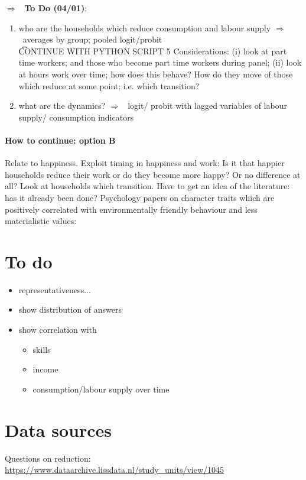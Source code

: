 \documentclass[12pt]{article}
\newcommand{\ar}{$\Rightarrow$ \ }
\begin{document}
\ar \textbf{To Do (04/01)}:
\begin{enumerate}
\item who are the households which reduce consumption and labour supply \ar averages by group; pooled logit/probit\\ 
\t{CONTINUE WITH PYTHON SCRIPT 5}
Considerations:
(i) look at part time workers; and those who become part time workers during panel; (ii) look at hours work over time; how does this behave? How do they move of those which reduce at some point; i.e. which transition? 
\item what are the dynamics? \ar logit/ probit with lagged variables of labour supply/ consumption indicators
\end{enumerate}

\paragraph{How to continue: option B}
 Relate to happiness. Exploit timing in happiness and work: Is it that happier households reduce their work or do they become more happy? Or no difference at all? Look at households which transition. 
 Have to get an idea of the literature: has it already been done? Psychology papers on character traits which are positively correlated with environmentally friendly behaviour and less materialistic values: \cite{Brown2005AreLifestyle}


\section{To do}
\begin{itemize}
	\item representativeness...
	\item show distribution of answers \checkmark
	\item show correlation with 
	\begin{itemize}
		\item skills
		\item income
		\item consumption/labour supply over time \checkmark
	\end{itemize}
\end{itemize}

\section{Data sources}
Questions on reduction:
\url{https://www.dataarchive.lissdata.nl/study_units/view/1045}
\end{document}
